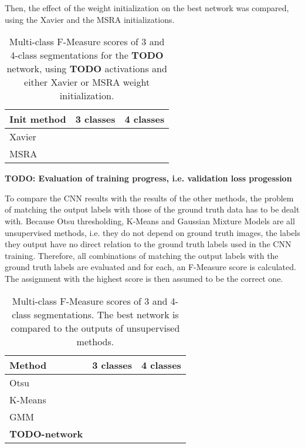 \noindent Then, the effect of the weight initialization on the best network was compared, using the Xavier and the MSRA initializations.

\begin {table}
	\centering
	\begin {tabular}[!ht]{|l|c|c|}
		\hline
		\textbf{Init method}& \textbf{3 classes}& \textbf{4 classes}\\ \hline
		Xavier& & \\ \hline
		MSRA& & \\ \hline
	\end {tabular}
\caption[]{Multi-class F-Measure scores of 3 and 4-class segmentations for the \textbf{TODO} network, using \textbf{TODO} activations and either Xavier or MSRA weight initialization.}
\end {table}

\textbf{TODO: Evaluation of training progress, i.e. validation loss progession}


To compare the CNN results with the results of the other methods, the problem of matching the output labels with those of the ground truth data has to be dealt with. Because Otsu thresholding, K-Means and Gaussian Mixture Models are all unsupervised methods, i.e. they do not depend on ground truth images, the labels they output have no direct relation to the ground truth labels used in the CNN training. Therefore, all combinations of matching the output labels with the ground truth labels are evaluated and for each, an F-Measure score is calculated. The assignment with the highest score is then assumed to be the correct one.


\begin {table}
	\centering
	\begin {tabular}[!ht]{|l|c|c|}
		\hline
		\textbf{Method}& \textbf{3 classes}& \textbf{4 classes}\\ \hline
		Otsu& & \\ \hline
		K-Means& & \\ \hline
		GMM& & \\ \hline
		\textbf{TODO-network}& & \\ \hline
	\end {tabular}
\caption[]{Multi-class F-Measure scores of 3 and 4-class segmentations. The best network is compared to the outputs of unsupervised methods.}
\end {table}